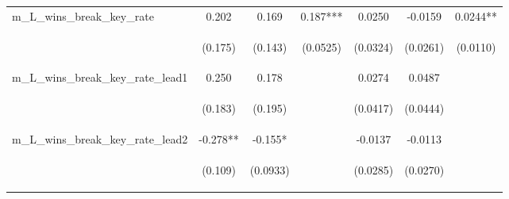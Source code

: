 \documentclass[]{article}
\begin{document}
\begin{center}
\begin{tabular}{lcccccc}
m\_L\_wins\_break\_key\_rate & 0.202 & 0.169 & 0.187*** & 0.0250 & -0.0159 & 0.0244** \\
\vspace{4pt} & \begin{footnotesize}(0.175)\end{footnotesize} & \begin{footnotesize}(0.143)\end{footnotesize} & \begin{footnotesize}(0.0525)\end{footnotesize} & \begin{footnotesize}(0.0324)\end{footnotesize} & \begin{footnotesize}(0.0261)\end{footnotesize} & \begin{footnotesize}(0.0110)\end{footnotesize} \\
m\_L\_wins\_break\_key\_rate\_lead1 & 0.250 & 0.178 &  & 0.0274 & 0.0487 &  \\
\vspace{4pt} & \begin{footnotesize}(0.183)\end{footnotesize} & \begin{footnotesize}(0.195)\end{footnotesize} & \begin{footnotesize}\end{footnotesize} & \begin{footnotesize}(0.0417)\end{footnotesize} & \begin{footnotesize}(0.0444)\end{footnotesize} & \begin{footnotesize}\end{footnotesize} \\
m\_L\_wins\_break\_key\_rate\_lead2 & -0.278** & -0.155* &  & -0.0137 & -0.0113 &  \\
\vspace{4pt} & \begin{footnotesize}(0.109)\end{footnotesize} & \begin{footnotesize}(0.0933)\end{footnotesize} & \begin{footnotesize}\end{footnotesize} & \begin{footnotesize}(0.0285)\end{footnotesize} & \begin{footnotesize}(0.0270)\end{footnotesize} & \begin{footnotesize}\end{footnotesize} \\

\end{tabular}
\end{center}
\end{document}

